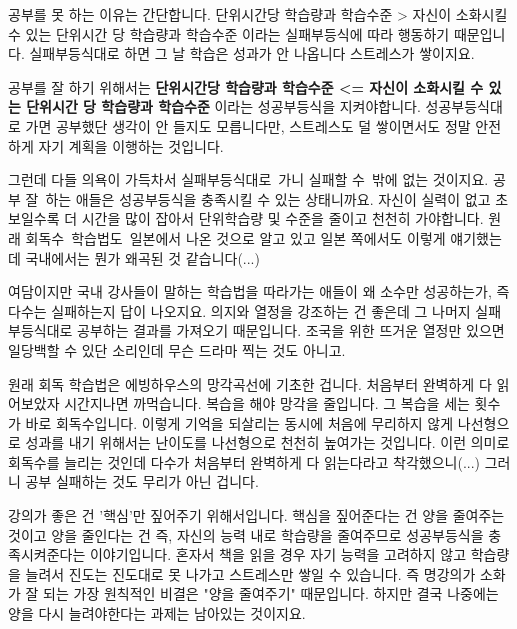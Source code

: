 공부를 못 하는 이유는 간단합니다.
단위시간당 학습량과 학습수준 > 자신이 소화시킬 수 있는 단위시간 당 학습량과 학습수준
이라는 실패부등식에 따라 행동하기 때문입니다.
실패부등식대로 하면 그 날 학습은 성과가 안 나옵니다 스트레스가 쌓이지요.
\vspace{5mm}

공부를 잘 하기 위해서는
\textbf{단위시간당 학습량과 학습수준 <= 자신이 소화시킬 수 있는 단위시간 당 학습량과 학습수준}
이라는 성공부등식을 지켜야합니다.
성공부등식대로 가면 공부했단 생각이 안 들지도 모릅니다만, 스트레스도 덜 쌓이면서도 정말 안전하게 자기 계획을 이행하는 것입니다.
\vspace{5mm}

그런데 다들 의욕이 가득차서 실패부등식대로 가니 실패할 수 밖에 없는 것이지요.
공부 잘 하는 애들은 성공부등식을 충족시킬 수 있는 상태니까요.
자신이 실력이 없고 초보일수록 더 시간을 많이 잡아서 단위학습량 및 수준을 줄이고 천천히 가야합니다.
원래 회독수 학습법도 일본에서 나온 것으로 알고 있고 일본 쪽에서도 이렇게 얘기했는데 국내에서는 뭔가 왜곡된 것 같습니다(...)
\vspace{5mm}

여담이지만 국내 강사들이 말하는 학습법을 따라가는 애들이 왜 소수만 성공하는가, 즉 다수는 실패하는지 답이 나오지요.
의지와 열정을 강조하는 건 좋은데 그 나머지 실패부등식대로 공부하는 결과를 가져오기 때문입니다.
조국을 위한 뜨거운 열정만 있으면 일당백할 수 있단 소리인데 무슨 드라마 찍는 것도 아니고.
\vspace{5mm}

원래 회독 학습법은 에빙하우스의 망각곡선에 기초한 겁니다.
처음부터 완벽하게 다 읽어보았자 시간지나면 까먹습니다. 복습을 해야 망각을 줄입니다.
그 복습을 세는 횟수가 바로 회독수입니다.
이렇게 기억을 되살리는 동시에 처음에 무리하지 않게 나선형으로 성과를 내기 위해서는 난이도를 나선형으로 천천히 높여가는 것입니다.
이런 의미로 회독수를 늘리는 것인데 다수가 처음부터 완벽하게 다 읽는다라고 착각했으니(...) 그러니 공부 실패하는 것도 무리가 아닌 겁니다.
\vspace{5mm}

강의가 좋은 건 '핵심'만 짚어주기 위해서입니다. 핵심을 짚어준다는 건 양을 줄여주는 것이고
양을 줄인다는 건 즉, 자신의 능력 내로 학습량을 줄여주므로 성공부등식을 충족시켜준다는 이야기입니다.
혼자서 책을 읽을 경우 자기 능력을 고려하지 않고 학습량을 늘려서 진도는 진도대로 못 나가고 스트레스만 쌓일 수 있습니다.
즉 명강의가 소화가 잘 되는 가장 원칙적인 비결은 "양을 줄여주기" 때문입니다.
하지만 결국 나중에는 양을 다시 늘려야한다는 과제는 남아있는 것이지요.
\vspace{5mm}

